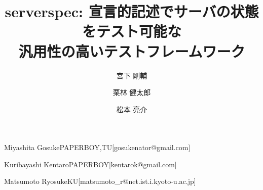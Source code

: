 \documentclass[submit,techreq,noauthor]{ipsj}
\begin{document}
\title{serverspec: 宣言的記述でサーバの状態をテスト可能な\\
汎用性の高いテストフレームワーク}




\author{宮下 剛輔}{Miyashita Gosuke}{PAPERBOY,TU}[gosukenator@gmail.com]
\author{栗林 健太郎}{Kuribayashi Kentaro}{PAPERBOY}[kentarok@gmail.com]
\author{松本 亮介}{Matsumoto Ryosuke}{KU}[matsumoto\_r@net.ist.i.kyoto-u.ac.jp]



\maketitle





\end{document}
